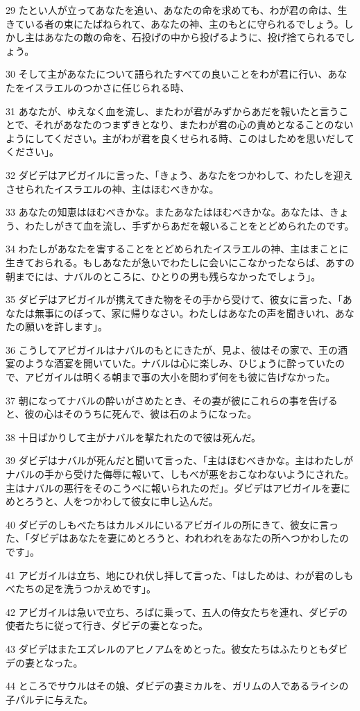 \par 29 たとい人が立ってあなたを追い、あなたの命を求めても、わが君の命は、生きている者の束にたばねられて、あなたの神、主のもとに守られるでしょう。しかし主はあなたの敵の命を、石投げの中から投げるように、投げ捨てられるでしょう。
\par 30 そして主があなたについて語られたすべての良いことをわが君に行い、あなたをイスラエルのつかさに任じられる時、
\par 31 あなたが、ゆえなく血を流し、またわが君がみずからあだを報いたと言うことで、それがあなたのつまずきとなり、またわが君の心の責めとなることのないようにしてください。主がわが君を良くせられる時、このはしためを思いだしてください」。
\par 32 ダビデはアビガイルに言った、「きょう、あなたをつかわして、わたしを迎えさせられたイスラエルの神、主はほむべきかな。
\par 33 あなたの知恵はほむべきかな。またあなたはほむべきかな。あなたは、きょう、わたしがきて血を流し、手ずからあだを報いることをとどめられたのです。
\par 34 わたしがあなたを害することをとどめられたイスラエルの神、主はまことに生きておられる。もしあなたが急いでわたしに会いにこなかったならば、あすの朝までには、ナバルのところに、ひとりの男も残らなかったでしょう」。
\par 35 ダビデはアビガイルが携えてきた物をその手から受けて、彼女に言った、「あなたは無事にのぼって、家に帰りなさい。わたしはあなたの声を聞きいれ、あなたの願いを許します」。
\par 36 こうしてアビガイルはナバルのもとにきたが、見よ、彼はその家で、王の酒宴のような酒宴を開いていた。ナバルは心に楽しみ、ひじょうに酔っていたので、アビガイルは明くる朝まで事の大小を問わず何をも彼に告げなかった。
\par 37 朝になってナバルの酔いがさめたとき、その妻が彼にこれらの事を告げると、彼の心はそのうちに死んで、彼は石のようになった。
\par 38 十日ばかりして主がナバルを撃たれたので彼は死んだ。
\par 39 ダビデはナバルが死んだと聞いて言った、「主はほむべきかな。主はわたしがナバルの手から受けた侮辱に報いて、しもべが悪をおこなわないようにされた。主はナバルの悪行をそのこうべに報いられたのだ」。ダビデはアビガイルを妻にめとろうと、人をつかわして彼女に申し込んだ。
\par 40 ダビデのしもべたちはカルメルにいるアビガイルの所にきて、彼女に言った、「ダビデはあなたを妻にめとろうと、われわれをあなたの所へつかわしたのです」。
\par 41 アビガイルは立ち、地にひれ伏し拝して言った、「はしためは、わが君のしもべたちの足を洗うつかえめです」。
\par 42 アビガイルは急いで立ち、ろばに乗って、五人の侍女たちを連れ、ダビデの使者たちに従って行き、ダビデの妻となった。
\par 43 ダビデはまたエズレルのアヒノアムをめとった。彼女たちはふたりともダビデの妻となった。
\par 44 ところでサウルはその娘、ダビデの妻ミカルを、ガリムの人であるライシの子パルテに与えた。

